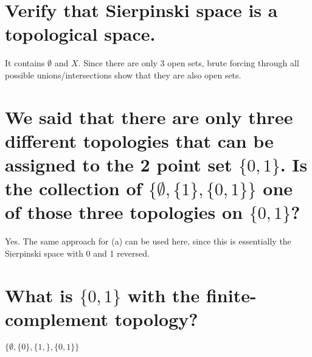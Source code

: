 \begin{parts}
 
 \part{Verify that Sierpinski space is a topological space.}
 
 
\begin{solution}
It contains $\emptyset$ and $X$. Since there are only 3 open sets, brute forcing through all possible unions/intersections show that they are also open sets.
\end{solution}

\part{We said that there are only three different topologies that can be assigned to the 2 point set $\{0,1\}$.  Is the collection of $\{\emptyset, \{1\},\{0,1\}\}$ one of those three topologies on $\{0,1\}$?}

\begin{solution}
 Yes. The same approach for (a) can be used here, since this is essentially the Sierpinski space with 0 and 1 reversed.
\end{solution}

\part{What is $\{0,1\}$ with the finite-complement topology?}

\begin{solution}
 $\{\emptyset, \{0\}, \{1,\}, \{0,1\}\}$
\end{solution}
\end{parts}


